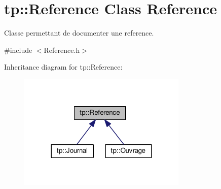 \hypertarget{classtp_1_1Reference}{}\section{tp\+:\+:Reference Class Reference}
\label{classtp_1_1Reference}


Classe permettant de documenter une reference.  




{\ttfamily \#include $<$Reference.\+h$>$}



Inheritance diagram for tp\+:\+:Reference\+:\nopagebreak
\begin{figure}[H]
\begin{center}
\leavevmode
\includegraphics[width=228pt]{classtp_1_1Reference__inherit__graph}
\end{center}
\end{figure}
